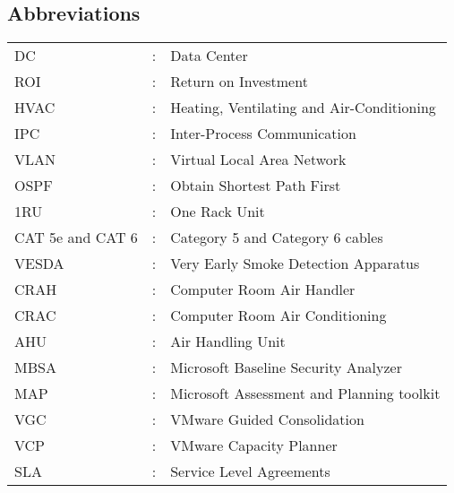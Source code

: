 \documentclass[12pt,a4paper]{report}
\begin{document}
\pagestyle{plain}
\begin{normalsize}
		\begin{center}				%
			
				\section*{Abbreviations}
				\vspace{.15 in}       %
			
		\end{center}

\begin{tabular}{lll}
\vspace{0.1 in}
	DC	&	:	&	Data Center	\\
\vspace{0.1 in}
	ROI &: &Return on Investment \\
\vspace{0.1 in}
	HVAC &:& Heating, Ventilating and Air-Conditioning	\\
\vspace{0.1 in}
	IPC &:& Inter-Process Communication	\\
\vspace{0.1 in}
	VLAN &:& Virtual Local Area Network	\\
\vspace{0.1 in}
	OSPF &: &Obtain Shortest Path First \\
\vspace{0.1 in}
	1RU &:& One Rack Unit \\
\vspace{0.1 in}
CAT 5e and CAT 6   & : & Category 5 and Category 6 cables \\
\vspace{0.1 in}
VESDA & : & Very Early Smoke Detection Apparatus \\
\vspace{0.1 in}
CRAH & : & Computer Room Air Handler \\
\vspace{0.1 in}
CRAC & : & Computer Room Air Conditioning \\
\vspace{0.1 in}
AHU	& : & Air Handling Unit \\
\vspace{0.1 in}
MBSA & :& Microsoft Baseline Security Analyzer\\
\vspace{0.1 in}
MAP & : & Microsoft Assessment and Planning toolkit\\
\vspace{0.1 in}
VGC & : & VMware Guided Consolidation\\
\vspace{0.1 in}
VCP & : & VMware Capacity Planner\\
\vspace{0.1 in}
SLA & : & Service Level Agreements\\


\end{tabular}
\end{normalsize}
\end{document}

